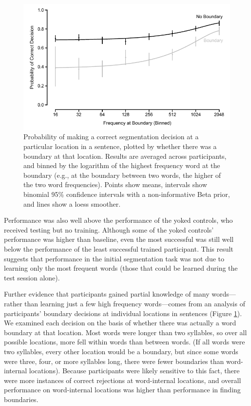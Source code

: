 \documentclass[10pt]{article}
\begin{document}
\begin{figure}[t]
\begin{center}
\includegraphics{boundary_freqs_col.pdf}
\caption{\label{fig:freq} Probability of making a correct segmentation decision at a particular location in a sentence, plotted by whether there was a boundary at that location. Results are averaged across participants, and binned by the logarithm of the highest frequency word at the boundary (e.g., at the boundary between two words, the higher of the two word frequencies). Points show means, intervals show binomial 95\% confidence intervals with a non-informative Beta prior, and lines show a loess smoother.}
\end{center}
\end{figure}

Performance was also well above the performance of the yoked controls, who received testing but no training. Although some of the yoked controls' performance was higher than baseline, even the most successful was still well below the performance of the least successful trained participant. This result suggests that performance in the initial segmentation task was not due to learning only the most frequent words (those that could be learned during the test session alone). 

Further evidence that participants gained partial knowledge of many words---rather than learning just a few high frequency words---comes from an analysis of participants' boundary decisions at individual locations in sentences (Figure \ref{fig:freq}). We examined each decision on the basis of whether there was actually a word boundary at that location. Most words were longer than two syllables, so over all possible locations, more fell within words than between words. (If all words were two syllables, every other location would be a boundary, but since some words were three, four, or more syllables long, there were fewer boundaries than word-internal locations). Because participants were likely sensitive to this fact, there were more instances of correct rejections at word-internal locations, and overall performance on word-internal locations was higher than performance in finding boundaries. 
\end{document}
